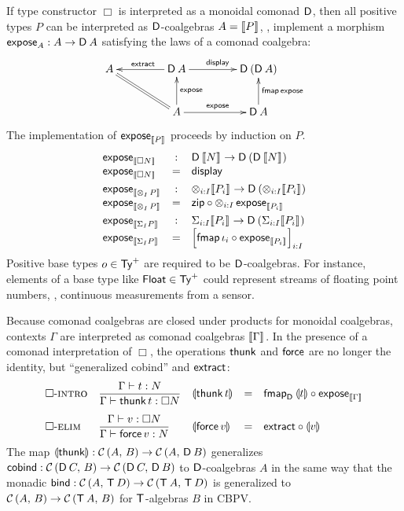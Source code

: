 \documentclass[acmsmall,review,anonymous]{acmart}\settopmatter{printfolios=true,printccs=false,printacmref=false}
\theoremstyle{remark}
\begin{document}
If type constructor $\Box$ is interpreted as a monoidal comonad $\D$,
then all positive types $P$ can be interpreted as $\D$-coalgebras
$A = \den P$, \ie, implement a morphism $\expose[A] : A \to \D\,A$
satisfying the laws of a comonad coalgebra:
\[
\xymatrix@C=10ex{
A  \ar@{=}[dr]
  & \D\,A \ar[l]_{\textract} \ar[r]^{\tdisplay}
  & \D\,(\D\,A)
\\
  & A \ar[u]_{\texpose} \ar[r]^{\texpose}
  & \D\,A \ar[u]_{\tfmap\,\texpose}
}
\]
The implementation of $\expose[\den P]$ proceeds by induction on $P$.
\[
\begin{array}{lcl}
  \expose[\den{\Box N}] & : & {\D\,\den N} \to {\D\,(\D\,\den N)} \\
  \expose[\den{\Box N}] & = & \display
\\[1ex]
  \expose[\den{\tupt I P}] & : & \tupt {i:I} {\den{P_i}} \to \D\,(\tupt {i:I} {\den{P_i}}) \\
  \expose[\den{\tupt I P}] & = & \tzip \comp \tupt {i:I} \expose[\den{P_i}]
\\[1ex]
  \expose[\den{\sumt I P}] & : & \sumt {i:I} {\den{P_i}} \to \D\,(\sumt {i:I} {\den{P_i}}) \\
  \expose[\den{\sumt I P}] & = & \left[\tfmap\,\iota_i \comp \expose[\den{P_i}]\right]_{i:I} \\
\end{array}
\]
Positive base types $o \in \PTy$ are required to be $\D$-coalgebras.
For instance, elements of a base type like
$\Float \in \PTy$ could represent streams of floating point numbers,
\eg, continuous measurements from a sensor.

Because comonad coalgebras are closed under products for monoidal
coalgebras, contexts $\Gamma$ are interpreted as comonad coalgebras
$\den\Gamma$.  In the presence of a comonad interpretation of $\Box$,
the operations $\tthunk$ and $\tforce$ are no longer the identity, but
``generalized cobind'' and $\extract$:
\[
\begin{array}{lllcl}
 \rintro\Box
  & \ru{\oCompTy \Gamma t N
      }{\ValTy \Gamma {\thunk t} {\Box N}}
  & \dent{\thunk t} & = & \fmap[\D]{\dent t} \comp \expose[\den\Gamma]
\\[3ex]
 \relim\Box
  & \ru{\ValTy \Gamma v {\Box N}
      }{\oCompTy \Gamma {\force v} N}
  & \dent{\force v} & = & \textract \comp \dent v
\end{array}
\]
The map $\dent\tthunk : \Hom A B \to \Hom A {\D\,B}$ generalizes
$\tcobind : \Hom{\D\,C} B \to \Hom{\D\,C}{\D\,B}$ to $\D$-coalgebras
$A$ in the same way that the monadic
$\tbind : \Hom{A}{\T\,D} \to \Hom{\T\,A}{\T\,D}$ is generalized to
$\Hom{A}{B} \to \Hom{\T\,A}{B}$ for $\T$-algebras $B$ in CBPV.
\end{document}
